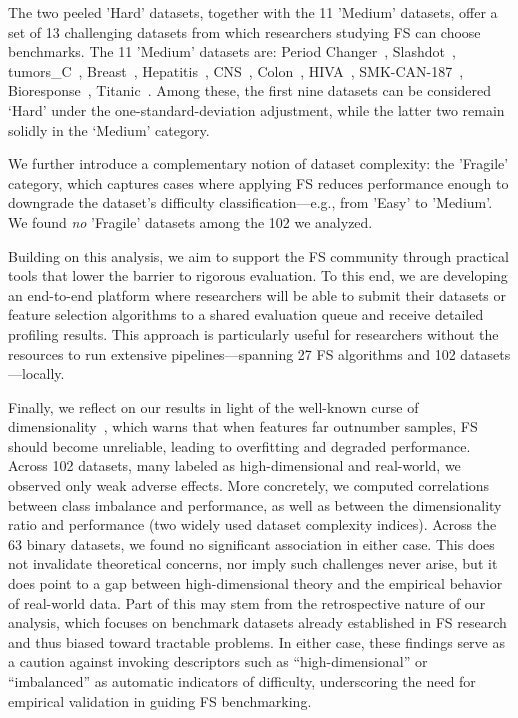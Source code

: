 \documentclass[preprint,12pt,authoryear]{elsarticle}
\begin{document}
The two peeled 'Hard' datasets, together with the 11 'Medium' datasets, offer a set of 13 challenging datasets from which researchers studying FS can choose benchmarks. The 11 'Medium' datasets are: Period Changer~\cite{period_changer_729}, Slashdot~\cite{read2011classifier}, tumors\_C~\cite{read2011classifier}, Breast~\cite{pochet2004systematic},
Hepatitis~\cite{hepatitis_46}, 
CNS~\cite{pomeroy2002prediction}, 
Colon~\cite{alon1999broad}, 
HIVA~\cite{guyon2006performance}, 
SMK-CAN-187~\cite{li2017feature}, Bioresponse~\cite{vanschoren2014openml}, Titanic~\cite{ekinci2018comparative}.
 Among these, the first nine datasets can be considered ‘Hard’ under the one-standard-deviation adjustment, while the latter two remain solidly in the ‘Medium’ category.
\vspace{1mm}

We further introduce a complementary notion of dataset complexity: the 'Fragile' category, which captures cases where applying FS reduces performance enough to downgrade the dataset’s difficulty classification—e.g., from 'Easy' to 'Medium'. We found \emph{no} 'Fragile' datasets among the 102 we analyzed.

\vspace{1mm}

Building on this analysis, we aim to support the FS community through practical tools that lower the barrier to rigorous evaluation. To this end, we are developing an end-to-end platform where researchers will be able to submit their datasets or feature selection algorithms to a shared evaluation queue and receive detailed profiling results. This approach is particularly useful for researchers without the resources to run extensive pipelines—spanning 27 FS algorithms and 102 datasets—locally. 
\vspace{1mm}




Finally, we reflect on our results in light of the well-known curse of dimensionality~\cite{bellman1957dynamic,donoho2000high,RigolletAOS,AminiWain09}, which warns that when features far outnumber samples, FS should become unreliable, leading to overfitting and degraded performance. Across 102 datasets, many labeled as high-dimensional and real-world, we observed only weak adverse effects. More concretely, we computed correlations between class imbalance and performance, as well as between the dimensionality ratio and performance (two widely used dataset complexity indices). Across the 63 binary datasets, we found no significant association in either case. This does not invalidate theoretical concerns, nor imply such challenges never arise, but it does point to a gap between high-dimensional theory and the empirical behavior of real-world data. Part of this may stem from the retrospective nature of our analysis, which focuses on benchmark datasets already established in FS research and thus biased toward tractable problems. In either case, these findings serve as a caution against invoking descriptors such as “high-dimensional” or “imbalanced” as automatic indicators of difficulty, underscoring the need for empirical validation in guiding FS benchmarking.
\end{document}
